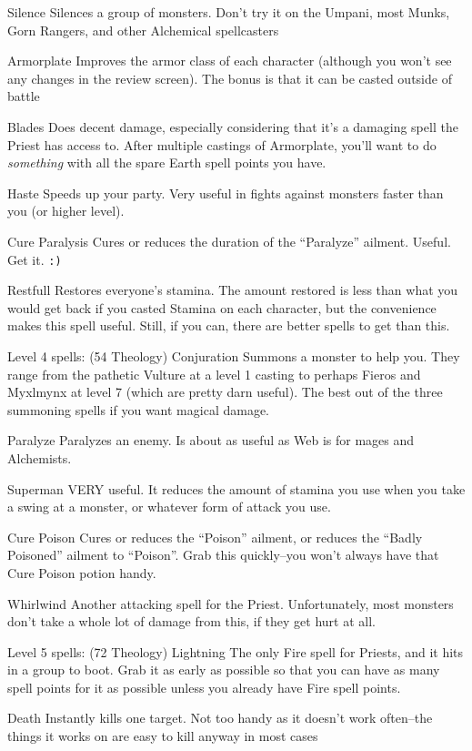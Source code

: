 \documentclass[12pt]{article}
\begin{document}
Silence Silences a group of monsters. Don't try it on the Umpani, most
Munks, Gorn Rangers, and other Alchemical spellcasters

Armorplate Improves the armor class of each character (although you
won't see any changes in the review screen). The bonus is that it can be
casted outside of battle

Blades Does decent damage, especially considering that it's a damaging
spell the Priest has access to. After multiple castings of Armorplate,
you'll want to do \emph{something} with all the spare Earth spell points
you have.

Haste Speeds up your party. Very useful in fights against monsters
faster than you (or higher level).

Cure Paralysis Cures or reduces the duration of the ``Paralyze''
ailment. Useful. Get it. \texttt{:)}

Restfull Restores everyone's stamina. The amount restored is less than
what you would get back if you casted Stamina on each character, but the
convenience makes this spell useful. Still, if you can, there are better
spells to get than this.

Level 4 spells: (54 Theology) Conjuration Summons a monster to help you.
They range from the pathetic Vulture at a level 1 casting to perhaps
Fieros and Myxlmynx at level 7 (which are pretty darn useful). The best
out of the three summoning spells if you want magical damage.

Paralyze Paralyzes an enemy. Is about as useful as Web is for mages and
Alchemists.

Superman VERY useful. It reduces the amount of stamina you use when you
take a swing at a monster, or whatever form of attack you use.

Cure Poison Cures or reduces the ``Poison'' ailment, or reduces the
``Badly Poisoned'' ailment to ``Poison''. Grab this quickly--you won't
always have that Cure Poison potion handy.

Whirlwind Another attacking spell for the Priest. Unfortunately, most
monsters don't take a whole lot of damage from this, if they get hurt at
all.

Level 5 spells: (72 Theology) Lightning The only Fire spell for Priests,
and it hits in a group to boot. Grab it as early as possible so that you
can have as many spell points for it as possible unless you already have
Fire spell points.

Death Instantly kills one target. Not too handy as it doesn't work
often--the things it works on are easy to kill anyway in most cases
\end{document}
